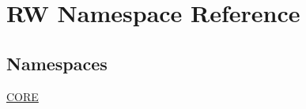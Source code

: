 \hypertarget{namespace_r_w}{}\section{RW Namespace Reference}
\label{namespace_r_w}
\subsection*{Namespaces}
\begin{DoxyCompactItemize}
\item 
 \hyperlink{namespace_r_w_1_1_c_o_r_e}{C\+O\+RE}
\end{DoxyCompactItemize}
